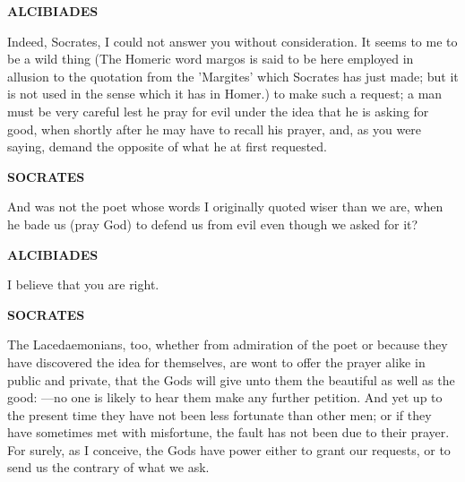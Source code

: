 \documentclass[11pt,letter]{article}
\begin{document}
\par \textbf{ALCIBIADES}
\par   Indeed, Socrates, I could not answer you without consideration. It seems to me to be a wild thing (The Homeric word margos is said to be here employed in allusion to the quotation from the 'Margites' which Socrates has just made; but it is not used in the sense which it has in Homer.) to make such a request; a man must be very careful lest he pray for evil under the idea that he is asking for good, when shortly after he may have to recall his prayer, and, as you were saying, demand the opposite of what he at first requested.

\par \textbf{SOCRATES}
\par   And was not the poet whose words I originally quoted wiser than we are, when he bade us (pray God) to defend us from evil even though we asked for it?

\par \textbf{ALCIBIADES}
\par   I believe that you are right.

\par \textbf{SOCRATES}
\par   The Lacedaemonians, too, whether from admiration of the poet or because they have discovered the idea for themselves, are wont to offer the prayer alike in public and private, that the Gods will give unto them the beautiful as well as the good: —no one is likely to hear them make any further petition. And yet up to the present time they have not been less fortunate than other men; or if they have sometimes met with misfortune, the fault has not been due to their prayer. For surely, as I conceive, the Gods have power either to grant our requests, or to send us the contrary of what we ask.
\end{document}
